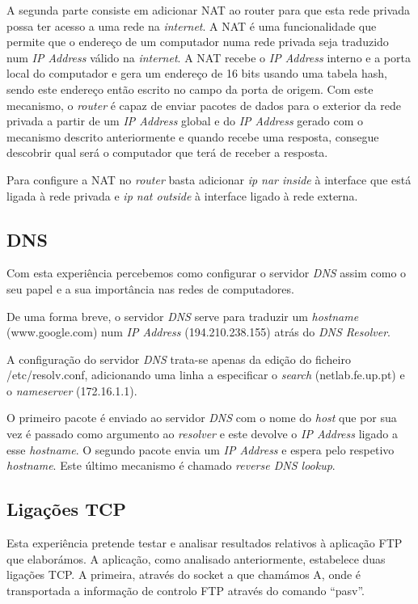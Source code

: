 \documentclass[a4paper]{article}
\begin{document}
A segunda parte consiste em adicionar NAT ao router para que esta rede privada possa ter acesso a uma rede na \textit{internet}. A NAT é uma funcionalidade que permite que o endereço de um computador numa rede privada seja traduzido num \textit{IP Address} válido na \textit{internet}. A NAT recebe o \textit{IP Address} interno e a porta local do computador e gera um endereço de 16 bits usando uma tabela hash, sendo este endereço então escrito no campo da porta de origem. Com este mecanismo, o \textit{router} é capaz de enviar pacotes de dados para o exterior da rede privada a partir de um \textit{IP Address} global e do \textit{IP Address} gerado com o mecanismo descrito anteriormente e quando recebe uma resposta, consegue descobrir qual será o computador que terá de receber a resposta.

Para configure a NAT no \textit{router} basta adicionar \textit{ip nar inside} à interface que está ligada à rede privada e \textit{ip nat outside} à interface ligado à rede externa.
\subsection{DNS}
Com esta experiência percebemos como configurar o servidor \textit{DNS} assim como o seu papel e a sua importância nas redes de computadores.

De uma forma breve, o servidor \textit{DNS} serve para traduzir um \textit{hostname} (www.google.com) num \textit{IP Address} (194.210.238.155) atrás do \textit{DNS Resolver}.

A configuração do servidor \textit{DNS} trata-se apenas da edição do ficheiro /etc/resolv.conf, adicionando uma linha a especificar o \textit{search} (netlab.fe.up.pt) e o \textit{nameserver} (172.16.1.1).

O primeiro pacote é enviado ao servidor \textit{DNS} com o nome do \textit{host} que por sua vez é passado como argumento ao \textit{resolver} e este devolve o \textit{IP Address} ligado a esse \textit{hostname}. O segundo pacote envia um \textit{IP Address} e espera pelo respetivo \textit{hostname}. Este último mecanismo é chamado \textit{reverse DNS lookup}.

\subsection{Ligações TCP}
Esta experiência pretende testar e analisar resultados relativos à aplicação FTP que elaborámos. A aplicação, como analisado anteriormente, estabelece duas ligações TCP. A primeira, através do socket a que chamámos A, onde é transportada a informação de controlo FTP através do comando “pasv”.
\end{document}
